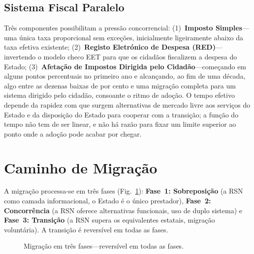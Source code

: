 \documentclass[11pt,a4paper,twocolumn]{article}
\begin{document}
\subsection{Sistema Fiscal Paralelo}

Três componentes possibilitam a pressão concorrencial: (1)~\textbf{Imposto Simples}---uma única taxa proporcional sem exceções, inicialmente ligeiramente abaixo da taxa efetiva existente; (2)~\textbf{Registo Eletrónico de Despesa (RED)}---invertendo o modelo checo EET para que os cidadãos fiscalizem a despesa do Estado; (3)~\textbf{Afetação de Impostos Dirigida pelo Cidadão}---começando em alguns pontos percentuais no primeiro ano e alcançando, ao fim de uma década, algo entre as dezenas baixas de por cento e uma migração completa para um sistema dirigido pelo cidadão, consoante o ritmo de adoção. O tempo efetivo depende da rapidez com que surgem alternativas de mercado livre aos serviços do Estado e da disposição do Estado para cooperar com a transição; a função do tempo não tem de ser linear, e não há razão para fixar um limite superior ao ponto onde a adoção pode acabar por chegar.

\section{Caminho de Migração}

A migração processa-se em três fases (Fig.~\ref{fig:migration}): \textbf{Fase~1: Sobreposição} (a RSN como camada informacional, o Estado é o único prestador), \textbf{Fase~2: Concorrência} (a RSN oferece alternativas funcionais, uso de duplo sistema) e \textbf{Fase~3: Transição} (a RSN supera os equivalentes estatais, migração voluntária). A transição é reversível em todas as fases.

\begin{figure}[ht]
\centering
{}
\caption{Migração em três fases---reversível em todas as fases.}
\label{fig:migration}
\end{figure}
\end{document}
